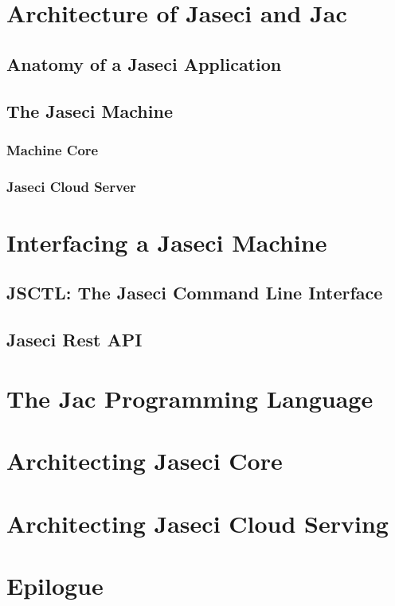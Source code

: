 \documentclass{book}
\begin{document}
\chapter{Architecture of Jaseci and Jac}
\section{Anatomy of a Jaseci Application}
\section{The Jaseci Machine}
\subsection{Machine Core}
\subsection{Jaseci Cloud Server}

\chapter{Interfacing a Jaseci Machine}
\section{JSCTL: The Jaseci Command Line Interface}
\section{Jaseci Rest API}

\chapter{The Jac Programming Language}


\chapter{Architecting Jaseci Core}


\chapter{Architecting Jaseci Cloud Serving}

\chapter*{Epilogue}
\end{document}
